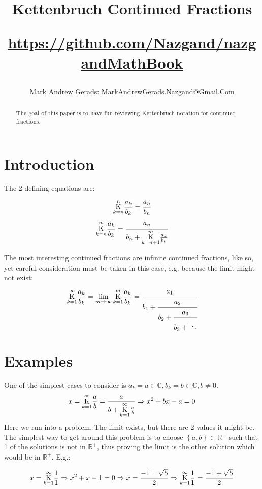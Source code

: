 \documentclass[]{article}
\author{Mark Andrew Gerads: \href{MailTo:MarkAndrewGerads.Nazgand@Gmail.Com}{MarkAndrewGerads.Nazgand@Gmail.Com}}
\title{
	Kettenbruch Continued Fractions
	
	\href{https://github.com/Nazgand/nazgandMathBook}{https://github.com/Nazgand/nazgandMathBook}
}
\newcommand{\Bqty}[1]{{\left\{#1\right\}}}
\newcommand{\ketten}[4]{\underset{#1}{\overset{#2}{\LARGE\mathrm K}}\frac{#3}{#4}}
\numberwithin{equation}{section}
\begin{document}
	
	\maketitle
	
	\begin{abstract}
		The goal of this paper is to have fun reviewing Kettenbruch notation for continued fractions.
	\end{abstract}
	
	\section{Introduction}
	The 2 defining equations are:
	\begin{equation}
		\ketten{k=n}{n}{a_k}{b_k}=\cfrac{a_n}{b_n}
	\end{equation}
	\begin{equation}
		\ketten{k=n}{m}{a_k}{b_k}=\cfrac{a_n}{b_n+\ketten{k=n+1}{m}{a_k}{b_k}}
	\end{equation}

	The most interesting continued fractions are infinite continued fractions, like so, yet careful consideration must be taken in this case, e.g. because the limit might not exist:
	\begin{equation}
		\ketten{k=1}{\infty}{a_k}{b_k}=
		\lim_{m\to\infty}\ketten{k=1}{m}{a_k}{b_k}=
		\cfrac{a_1}{b_1+\cfrac{a_2}{b_2+\cfrac{a_3}{b_3+\ddots}}}
	\end{equation}

	\section{Examples}
	One of the simplest cases to consider is $a_k=a\in\mathbb{C},b_k=b\in\mathbb{C},b\neq 0$.
	\begin{equation}
		x=\ketten{k=1}{\infty}{a}{b}=\frac{a}{b+\ketten{k=1}{\infty}{a}{b}}
		\Rightarrow
		x^2+bx-a=0
	\end{equation}
	Here we run into a problem. The limit exists, but there are 2 values it might be. The simplest way to get around this problem is to choose $\Bqty{a,b}\subset\mathbb{R}^+$ such that 1 of the solutions is not in $\mathbb{R}^+$, thus proving the limit is the other solution which would be in $\mathbb{R}^+$. E.g.:

	\begin{equation}
		x=\ketten{k=1}{\infty}{1}{1}
		\Rightarrow
		x^2+x-1=0
		\Rightarrow
		x=\frac{-1\pm\sqrt{5}}{2}
		\Rightarrow
		\ketten{k=1}{\infty}{1}{1}=\frac{-1+\sqrt{5}}{2}
	\end{equation}
\end{document}
